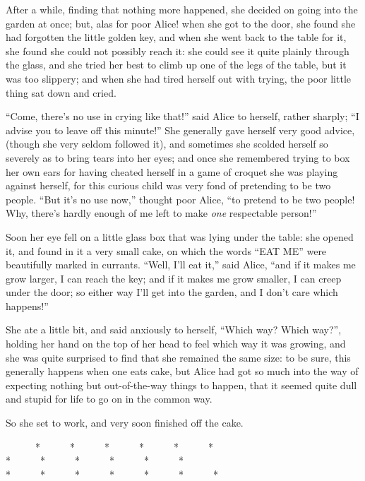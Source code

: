 \documentclass[book, 20pt]{extbook}
\begin{document}
After a while, finding that nothing more happened, she decided on going
into the garden at once; but, alas for poor Alice! when she got to the
door, she found she had forgotten the little golden key, and when she
went back to the table for it, she found she could not possibly reach
it: she could see it quite plainly through the glass, and she tried her
best to climb up one of the legs of the table, but it was too slippery;
and when she had tired herself out with trying, the poor little thing
sat down and cried.

``Come, there's no use in crying like that!'' said Alice to herself,
rather sharply; ``I advise you to leave off this minute!'' She generally
gave herself very good advice, (though she very seldom followed it), and
sometimes she scolded herself so severely as to bring tears into her
eyes; and once she remembered trying to box her own ears for having
cheated herself in a game of croquet she was playing against herself,
for this curious child was very fond of pretending to be two people.
``But it's no use now,'' thought poor Alice, ``to pretend to be two
people! Why, there's hardly enough of me left to make \emph{one}
respectable person!''

Soon her eye fell on a little glass box that was lying under the table:
she opened it, and found in it a very small cake, on which the words
``EAT ME'' were beautifully marked in currants. ``Well, I'll eat it,''
said Alice, ``and if it makes me grow larger, I can reach the key; and
if it makes me grow smaller, I can creep under the door; so either way
I'll get into the garden, and I don't care which happens!''

She ate a little bit, and said anxiously to herself, ``Which way? Which
way?'', holding her hand on the top of her head to feel which way it was
growing, and she was quite surprised to find that she remained the same
size: to be sure, this generally happens when one eats cake, but Alice
had got so much into the way of expecting nothing but out-of-the-way
things to happen, that it seemed quite dull and stupid for life to go on
in the common way.

So she set to work, and very soon finished off the cake.

\begin{center}
{\footnotesize ~~~~~~*~~~~~~*~~~~~~*~~~~~~*~~~~~~*~~~~~~*\\
*~~~~~~*~~~~~~*~~~~~~*~~~~~~*~~~~~~*\\
*~~~~~~*~~~~~~*~~~~~~*~~~~~~*~~~~~~*~~~~~~*\\}
\end{center}
\end{document}
